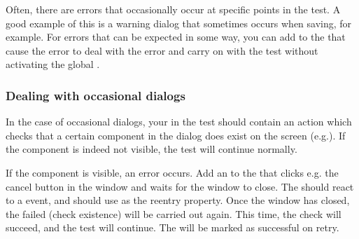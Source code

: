 Often, there are errors that occasionally occur at specific points in the test. A good example of this is a warning dialog that sometimes occurs when saving, for example. For errors that can be expected in some way, you can add \gdehandlers{} to the \gdcases{} that cause the error to deal with the error and carry on with the test without activating the global \gdehandlers{}.

\subsubsection{Dealing with occasional dialogs}
In the case of occasional dialogs, your \gdcase{} in the test should contain an action which checks that a certain component in the dialog does  exist on the screen (e.g.). If the component is indeed not visible, the test will continue normally. 

If the component is visible, an error occurs. Add an \gdehandler{} to the  \gdcase{} that clicks e.g. the cancel button in the window and waits for the window to close. The \gdehandler{} should react to a  event, and should use  as the reentry property. Once the window has closed, the failed \gdstep{} (check existence) will be carried out again. This time, the check will succeed, and the test will continue. The \gdstep{} will be marked as successful on retry. 


